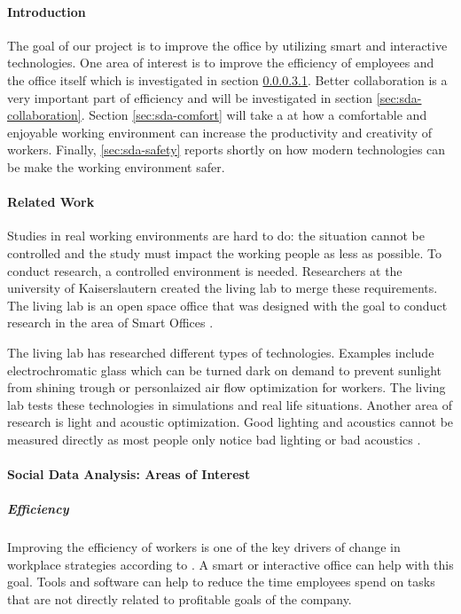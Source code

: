 \paragraph{Introduction}
The goal of our project is to improve the office by utilizing smart and interactive technologies. 
One area of interest is to improve the efficiency of employees and the office itself which is 
investigated in section \ref{sec:sda-efficiency}. Better collaboration is a very important part of 
efficiency and will be investigated in section \ref{sec:sda-collaboration}. Section \ref{sec:sda-comfort} 
will take a at how a comfortable and enjoyable working environment can increase the productivity and 
creativity of workers. Finally, \ref{sec:sda-safety} reports shortly on how modern technologies can 
be make the working environment safer.

\paragraph{Related Work}
Studies in real working environments are hard to do: the situation cannot be controlled and the 
study must impact the working people as less as possible. To conduct research, a controlled 
environment is needed. Researchers at the university of Kaiserslautern created the living lab to 
merge these requirements. The living lab is an open space office that was designed with the goal to 
conduct research in the area of Smart Offices \cite{living-lab}.


The living lab has researched different types of technologies. Examples include electrochromatic 
glass which can be turned dark on demand to prevent sunlight from shining trough or personlaized air 
flow optimization for workers. The living lab tests these technologies in simulations and real life 
situations. Another area of research is light and acoustic optimization. Good lighting and acoustics 
cannot be measured directly as most people only notice bad lighting or bad acoustics \cite{living-lab}.


\paragraph{Social Data Analysis: Areas of Interest}
\subparagraph{Efficiency}\label{sec:sda-efficiency}
Improving the efficiency of workers is one of the key drivers of change in workplace strategies 
according to \cite{hub13}. A smart or interactive office can help with this goal. Tools and software 
can help to reduce the time employees spend on tasks that are not directly related to profitable 
goals of the company.

